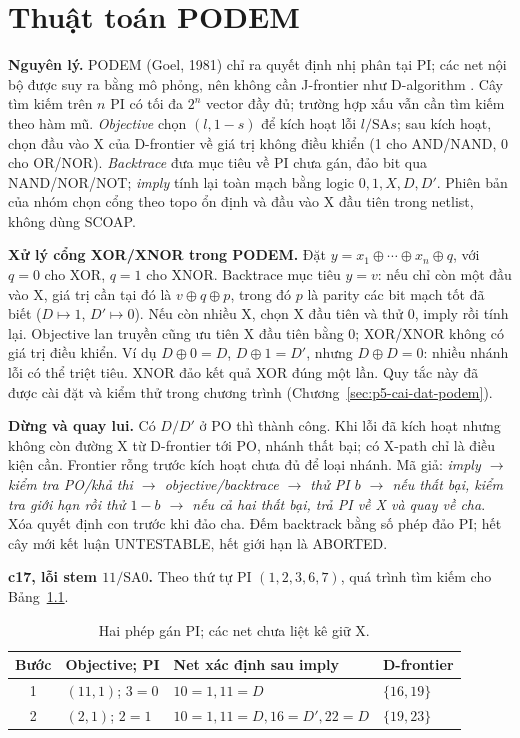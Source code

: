 \chapter{Thuật toán PODEM}
\label{sec:p3-podem}
\textbf{Nguyên lý.}
PODEM (Goel, 1981) chỉ ra quyết định nhị phân tại PI; các net nội bộ
được suy ra bằng mô phỏng, nên không cần J-frontier như D-algorithm
\cite{p3_goel1981,p1_wang2006}. Cây tìm kiếm trên $n$ PI có tối đa $2^n$
vector đầy đủ; trường hợp xấu vẫn cần tìm kiếm theo hàm mũ.
\emph{Objective} chọn $(l,1-s)$ để kích hoạt lỗi $l/\mathrm{SA}s$;
sau kích hoạt, chọn đầu vào X của D-frontier về giá trị không điều khiển
(1 cho AND/NAND, 0 cho OR/NOR).
\emph{Backtrace} đưa mục tiêu về PI chưa gán, đảo bit qua NAND/NOR/NOT;
\emph{imply} tính lại toàn mạch bằng logic $0,1,X,D,D'$.
Phiên bản của nhóm chọn cổng theo topo ổn định và đầu vào X đầu tiên
trong netlist, không dùng SCOAP.

\textbf{Xử lý cổng XOR/XNOR trong PODEM.}
\label{sec:p3-xor-xnor}
Đặt $y=x_1\oplus\cdots\oplus x_n\oplus q$, với $q=0$ cho XOR,
$q=1$ cho XNOR. Backtrace mục tiêu $y=v$: nếu chỉ còn một đầu vào X,
giá trị cần tại đó là $v\oplus q\oplus p$, trong đó $p$ là parity
các bit mạch tốt đã biết ($D\mapsto1$, $D'\mapsto0$).
Nếu còn nhiều X, chọn X đầu tiên và thử 0, imply rồi tính lại.
Objective lan truyền cũng ưu tiên X đầu tiên bằng 0; XOR/XNOR không có
giá trị điều khiển. Ví dụ $D\oplus0=D$, $D\oplus1=D'$,
nhưng $D\oplus D=0$: nhiều nhánh lỗi có thể triệt tiêu.
XNOR đảo kết quả XOR đúng một lần. Quy tắc này đã được cài đặt và kiểm
thử trong chương trình (Chương~\ref{sec:p5-cai-dat-podem}).

\textbf{Dừng và quay lui.}
Có $D/D'$ ở PO thì thành công. Khi lỗi đã kích hoạt nhưng không
còn đường X từ D-frontier tới PO, nhánh thất bại; có X-path chỉ là điều kiện
cần. Frontier rỗng trước kích hoạt chưa đủ để loại nhánh.
Mã giả: \emph{imply $\to$ kiểm tra PO/khả thi $\to$ objective/backtrace
$\to$ thử PI $b$ $\to$ nếu thất bại, kiểm tra giới hạn rồi thử $1-b$
$\to$ nếu cả hai thất bại, trả PI về X và quay về cha}.
Xóa quyết định con trước khi đảo cha. Đếm backtrack bằng số phép đảo PI;
hết cây mới kết luận UNTESTABLE, hết giới hạn là ABORTED.

\textbf{c17, lỗi stem $11/\mathrm{SA0}$.}
Theo thứ tự PI $(1,2,3,6,7)$, quá trình tìm kiếm cho Bảng~\ref{tab:p3-c17}.

\begin{table}[htbp]\centering\small
\caption{Hai phép gán PI; các net chưa liệt kê giữ X.}
\label{tab:p3-c17}
\begin{tabular}{@{}clll@{}}\toprule
Bước & Objective; PI & Net xác định sau imply & D-frontier\\\midrule
1 & $(11,1)$; $3=0$ & $10=1,11=D$ & $\{16,19\}$\\
2 & $(2,1)$; $2=1$ & $10=1,11=D,16=D',22=D$ & $\{19,23\}$\\\bottomrule
\end{tabular}
\end{table}

